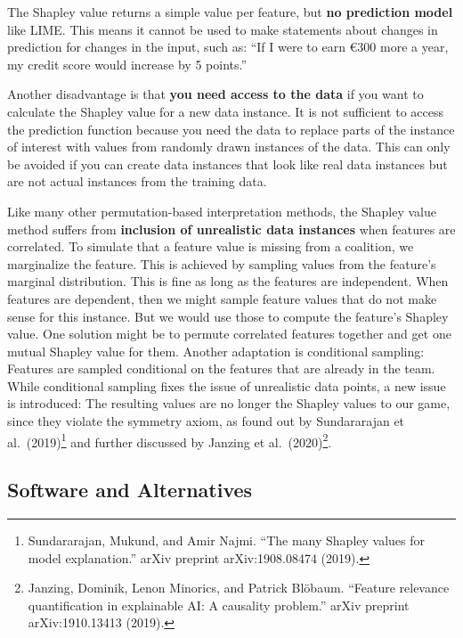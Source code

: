 \documentclass[
  11pt,
]{scrbook}
\begin{document}
The Shapley value returns a simple value per feature, but \textbf{no prediction model} like LIME.
This means it cannot be used to make statements about changes in prediction for changes in the input, such as:
``If I were to earn €300 more a year, my credit score would increase by 5 points.''

Another disadvantage is that \textbf{you need access to the data} if you want to calculate the Shapley value for a new data instance.
It is not sufficient to access the prediction function because you need the data to replace parts of the instance of interest with values from randomly drawn instances of the data.
This can only be avoided if you can create data instances that look like real data instances but are not actual instances from the training data.

Like many other permutation-based interpretation methods, the Shapley value method suffers from \textbf{inclusion of unrealistic data instances} when features are correlated.
To simulate that a feature value is missing from a coalition, we marginalize the feature.
This is achieved by sampling values from the feature's marginal distribution.
This is fine as long as the features are independent.
When features are dependent, then we might sample feature values that do not make sense for this instance.
But we would use those to compute the feature's Shapley value.
One solution might be to permute correlated features together and get one mutual Shapley value for them.
Another adaptation is conditional sampling: Features are sampled conditional on the features that are already in the team.
While conditional sampling fixes the issue of unrealistic data points, a new issue is introduced:
The resulting values are no longer the Shapley values to our game, since they violate the symmetry axiom, as found out by Sundararajan et al.~(2019)\footnote{Sundararajan, Mukund, and Amir Najmi. ``The many Shapley values for model explanation.'' arXiv preprint arXiv:1908.08474 (2019).} and further discussed by Janzing et al.~(2020)\footnote{Janzing, Dominik, Lenon Minorics, and Patrick Blöbaum. ``Feature relevance quantification in explainable AI: A causality problem.'' arXiv preprint arXiv:1910.13413 (2019).}.

\hypertarget{software-and-alternatives-4}{%
\subsection{Software and Alternatives}\label{software-and-alternatives-4}}
\end{document}
